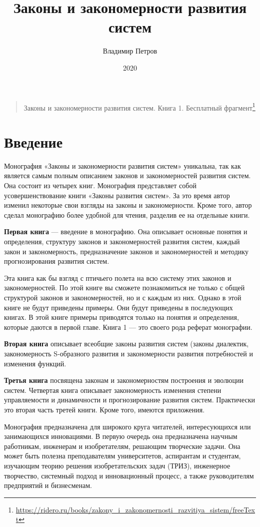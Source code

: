 \documentclass[11pt,a4paper]{article}
\title{Законы и закономерности развития систем}
\author{Владимир Петров}
\date{2020}
\begin{document}
\maketitle

\begin{quote}
  Законы и закономерности развития систем. Книга 1. Бесплатный
  фрагмент\footnote{\url{https://ridero.ru/books/zakony_i_zakonomernosti_razvitiya_sistem/freeText}} 
\end{quote}
\section*{Введение}

Монография «Законы и закономерности развития систем» уникальна, так как
является самым полным описанием законов и закономерностей развития систем. Она
состоит из четырех книг. Монография представляет собой усовершенствование
книги «Законы развития систем». За это время автор изменил некоторые свои
взгляды на законы и закономерности. Кроме того, автор сделал монографию более
удобной для чтения, разделив ее на отдельные книги.

\textbf{Первая книга} — введение в монографию. Она описывает основные понятия
и определения, структуру законов и закономерностей развития систем, каждый
закон и закономерность, предназначение законов и закономерностей и методику
прогнозирования развития систем.

Эта книга как бы взгляд с птичьего полета на всю систему этих законов и
закономерностей. По этой книге вы сможете познакомиться не только с общей
структурой законов и закономерностей, но и с каждым из них. Однако в этой
книге не будут приведены примеры. Они будут приведены в последующих книгах. В
этой книге примеры приводятся только на понятия и определения, которые даются
в первой главе. Книга 1 — это своего рода реферат монографии.

\textbf{Вторая книга} описывает всеобщие законы развития систем (законы
диалектик, закономерность S-образного развития и закономерности развития
потребностей и изменения функций.

\textbf{Третья книга} посвящена законам и закономерностям построения и
эволюции систем.  Четвертая книга описывает закономерность изменения степени
управляемости и динамичности и прогнозирование развития систем. Практически
это вторая часть третей книги. Кроме того, имеются приложения.

Монография предназначена для широкого круга читателей, интересующихся или
занимающихся инновациями. В первую очередь она предназначена научным
работникам, инженерам и изобретателям, решающим творческие задачи. Она может
быть полезна преподавателям университетов, аспирантам и студентам, изучающим
теорию решения изобретательских задач (ТРИЗ), инженерное творчество, системный
подход и инновационный процесс, а также руководителям предприятий и
бизнесменам. 
\end{document}
